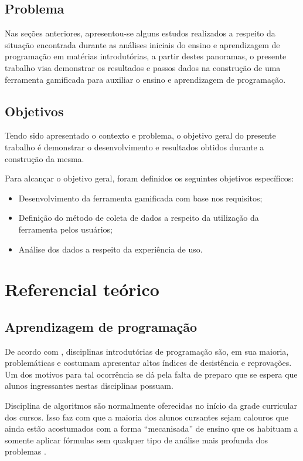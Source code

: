 \section{Problema}
Nas seções anteriores, apresentou-se alguns estudos realizados a respeito da situação encontrada durante as análises iniciais do ensino e aprendizagem
de programação em matérias introdutórias, a partir destes panoramas, o presente trabalho visa demonstrar os resultados e passos dados na construção de uma
ferramenta gamificada para auxiliar o ensino e aprendizagem de programação.
 
\section{Objetivos}
Tendo sido apresentado o contexto e problema, o objetivo geral do presente trabalho é demonstrar o desenvolvimento e resultados
obtidos durante a construção da mesma.

Para alcançar o objetivo geral, foram definidos os seguintes objetivos específicos:
\begin{itemize}
	\item Desenvolvimento da ferramenta gamificada com base nos requisitos;
	\item Definição do método de coleta de dados a respeito da utilização da ferramenta pelos usuários;
	\item Análise dos dados a respeito da experiência de uso.
\end{itemize}

\chapter{Referencial teórico}

\section{Aprendizagem de programação}
De acordo com , disciplinas introdutórias de programação são, em sua maioria, problemáticas e costumam apresentar
altos índices de desistência e reprovações. Um dos motivos para tal ocorrência se dá pela falta de preparo que se espera que alunos
ingressantes nestas disciplinas possuam.

Disciplina de algoritmos são normalmente oferecidas no início da grade curricular dos cursos. Isso faz com que a maioria dos alunos
cursantes sejam calouros que ainda estão acostumados com a forma ``mecanisada'' de ensino que os habituam a somente aplicar fórmulas 
sem qualquer tipo de análise mais profunda dos problemas \cite{KOLIVER}.

